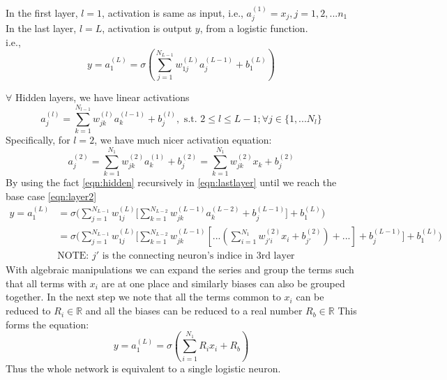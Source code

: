 \documentclass[letter,doc,notimes]{article}
\begin{document}
In the first layer, $l=1$, activation is same as input, i.e., $a^{(1)}_j = x_j, j=1, 2, ... n_1$ \\ 

In the last layer, $l=L$, activation is output $y$, from a logistic function. \\
 i.e.,
 \begin{equation}\label{eqn:lastlayer}
	 y = a^{(L)}_1 = \sigma(\sum_{j=1}^{N_{L-1}} w^{(L)}_{1j} a^{(L-1)}_j + b^{(L)}_1 )
 \end{equation} 
 
$\forall $ Hidden layers, we have linear activations \\
\begin{equation}\label{eqn:hidden}
 a^{(l)}_{j} = \sum_{k=1}^{N_{l-1}} w^{(l)}_{jk} a^{(l-1)}_k + b^{(l)}_j , \text{  s.t.  }  2 \le l \le L-1; \forall j \in \{1, ... N_l\}
\end{equation}
Specifically, for $l = 2$, we have much nicer activation equation:
\begin{equation} \label{eqn:layer2}
	a^{(2)}_{j} =  \sum_{k=1}^{N_{1}} w^{(2)}_{jk} a^{(1)}_k + b^{(2)}_j =  \sum_{k=1}^{N_{1}} w^{(2)}_{jk} x_k + b^{(2)}_j
\end{equation}
By using the fact \ref{eqn:hidden} recursively in \ref{eqn:lastlayer} until we reach the base case \ref{eqn:layer2}
  \begin{align*}
 	 y = a^{(L)}_1 & = \sigma\bigg(\sum_{j=1}^{N_{L-1}} w^{(L)}_{1j} \big[ \sum_{k=1}^{N_{L-2}} w^{(L-1)}_{jk} a^{(L-2)}_k + b^{(L-1)}_j  \big] + b^{(L)}_1 \bigg) \\
 	 & =  \sigma\bigg(\sum_{j=1}^{N_{L-1}} w^{(L)}_{1j} \big[ \sum_{k=1}^{N_{L-2}} w^{(L-1)}_{jk} [ ... ( \sum_{i=1}^{N_{1}} w^{(2)}_{j'i} x_i + b^{(2)}_{j'} ) +  ... ] + b^{(L-1)}_j  \big] + b^{(L)}_1 \bigg) \\
	 	 & \text{NOTE: $j'$ is the connecting neuron's indice in 3rd layer}
 \end{align*}
 With algebraic manipulations we can expand the series and group the terms such that all terms with $x_i$ are at one place and similarly biases can also be grouped together.
 In the next step we note that all the terms common to $x_i$  can be reduced to $R_i \in \mathbb{R}$ and all the biases can be reduced to a real number $R_b \in \mathbb{R}$
 This forms the equation:
\begin{equation}
	 y = a^{(L)}_1  = \sigma(\sum_{i=1}^{N_1} R_i x_i + R_b)
\end{equation}
Thus the whole network is equivalent to a single logistic neuron.
\end{document}
